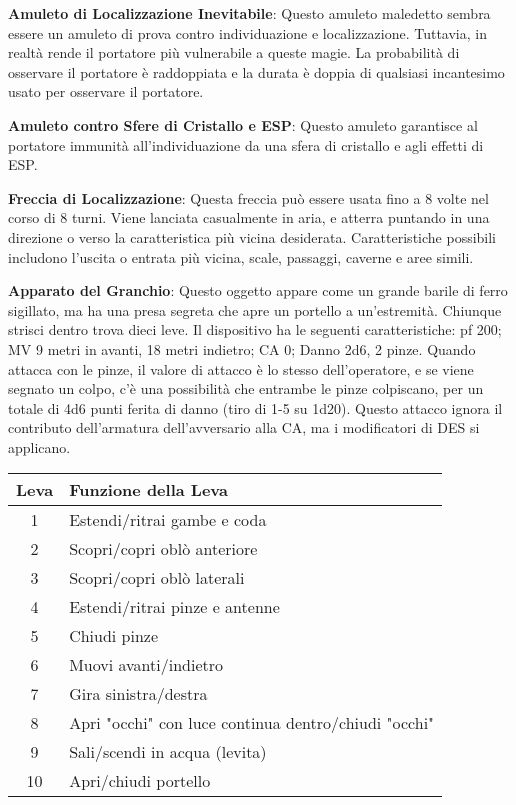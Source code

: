 \documentclass{article}
\begin{document}
\begin{multicols}{2}
\textbf{Amuleto di Localizzazione Inevitabile}: Questo amuleto maledetto sembra essere un amuleto di prova contro individuazione e localizzazione. Tuttavia, in realtà rende il portatore più vulnerabile a queste magie. La probabilità di osservare il portatore è raddoppiata e la durata è doppia di qualsiasi incantesimo usato per osservare il portatore.

\textbf{Amuleto contro Sfere di Cristallo e ESP}: Questo amuleto garantisce al portatore immunità all'individuazione da una sfera di cristallo e agli effetti di ESP.

\textbf{Freccia di Localizzazione}: Questa freccia può essere usata fino a 8 volte nel corso di 8 turni. Viene lanciata casualmente in aria, e atterra puntando in una direzione o verso la caratteristica più vicina desiderata. Caratteristiche possibili includono l'uscita o entrata più vicina, scale, passaggi, caverne e aree simili.

\textbf{Apparato del Granchio}: Questo oggetto appare come un grande barile di ferro sigillato, ma ha una presa segreta che apre un portello a un'estremità. Chiunque strisci dentro trova dieci leve. Il dispositivo ha le seguenti caratteristiche: pf 200; MV 9 metri in avanti, 18 metri indietro; CA 0; Danno 2d6, 2 pinze. Quando attacca con le pinze, il valore di attacco è lo stesso dell'operatore, e se viene segnato un colpo, c'è una possibilità che entrambe le pinze colpiscano, per un totale di 4d6 punti ferita di danno (tiro di 1-5 su 1d20). Questo attacco ignora il contributo dell'armatura dell'avversario alla CA, ma i modificatori di DES si applicano.

\begin{table}[h]
\centering
\begin{tabular}{|c|l|}
\hline
\textbf{Leva} & \textbf{Funzione della Leva} \\
\hline
1 & Estendi/ritrai gambe e coda \\
2 & Scopri/copri oblò anteriore \\
3 & Scopri/copri oblò laterali \\
4 & Estendi/ritrai pinze e antenne \\
5 & Chiudi pinze \\
6 & Muovi avanti/indietro \\
7 & Gira sinistra/destra \\
8 & Apri "occhi" con luce continua dentro/chiudi "occhi" \\
9 & Sali/scendi in acqua (levita) \\
10 & Apri/chiudi portello \\
\hline
\end{tabular}


\end{table}
\end{multicols}
\end{document}
